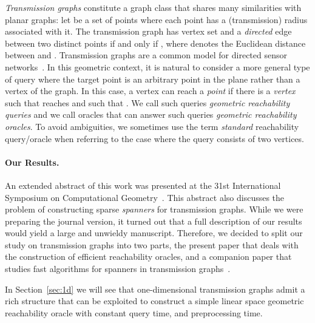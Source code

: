 \documentclass[11pt,a4paper]{paper}
\begin{document}
\emph{Transmission graphs} constitute a graph class that shares many
similarities with planar graphs:
let  be a set of points where each point  has a (transmission) radius
 associated
with it. The transmission graph has vertex set  and a
\emph{directed} edge between two distinct points  if and only if
,
where  denotes the Euclidean distance between  and . 
Transmission graphs are a common model for directed sensor 
networks~\cite{KaplanEtAl15,PelegRoditty10,RickenbachEtAl09}.
In this geometric context, it is natural to consider a more general
type of query where the target point is an arbitrary point in the plane 
rather than a vertex of the graph. In this case, a vertex  can 
reach a \emph{point}  if there is a \emph{vertex}  
such that  reaches  and such that . We call such 
queries \emph{geometric reachability queries} and we call oracles that 
can answer such queries \emph{geometric reachability oracles}. To avoid
ambiguities, we sometimes use the term \emph{standard} reachability 
query/oracle when referring to the case where the query consists of 
two vertices.

\paragraph*{Our Results.}
An extended abstract of this work was presented
at the 31st International Symposium on Computational
Geometry~\cite{KaplanMuRoSe15}. 
This abstract also discusses the problem of constructing
sparse \emph{spanners} for transmission graphs. While we were preparing the
journal version, it turned out that a full description of 
our results would yield a large and unwieldy manuscript. Therefore,
we decided to split our study on transmission graphs into two parts,
the present paper that deals with the construction of efficient 
reachability oracles, and a companion paper that studies fast algorithms
for spanners in transmission graphs~\cite{KaplanEtAl15}.

In Section~\ref{sec:1d} we will see that one-dimensional 
transmission graphs
admit a rich structure that
can be exploited to construct a simple linear space geometric reachability
oracle with constant query time, and   preprocessing time.
\end{document}
